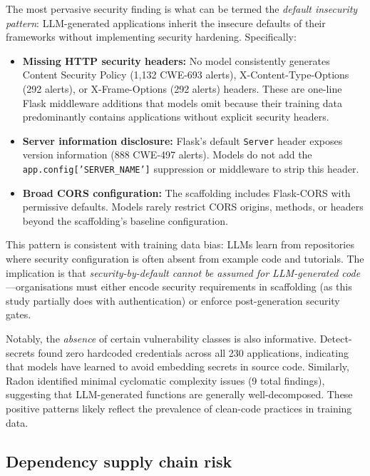 The most pervasive security finding is what can be termed the \textit{default insecurity pattern}: LLM-generated applications inherit the insecure defaults of their frameworks without implementing security hardening. Specifically:

\begin{itemize}
    \item \textbf{Missing HTTP security headers:} No model consistently generates Content Security Policy (1{,}132 CWE-693 alerts), X-Content-Type-Options (292 alerts), or X-Frame-Options (292 alerts) headers. These are one-line Flask middleware additions that models omit because their training data predominantly contains applications without explicit security headers.
    \item \textbf{Server information disclosure:} Flask's default \texttt{Server} header exposes version information (888 CWE-497 alerts). Models do not add the \texttt{app.config['SERVER\_NAME']} suppression or middleware to strip this header.
    \item \textbf{Broad CORS configuration:} The scaffolding includes Flask-CORS with permissive defaults. Models rarely restrict CORS origins, methods, or headers beyond the scaffolding's baseline configuration.
\end{itemize}

This pattern is consistent with training data bias: LLMs learn from repositories where security configuration is often absent from example code and tutorials. The implication is that \textit{security-by-default cannot be assumed for LLM-generated code}---organisations must either encode security requirements in scaffolding (as this study partially does with authentication) or enforce post-generation security gates.

Notably, the \textit{absence} of certain vulnerability classes is also informative. Detect-secrets found zero hardcoded credentials across all 230 applications, indicating that models have learned to avoid embedding secrets in source code. Similarly, Radon identified minimal cyclomatic complexity issues (9 total findings), suggesting that LLM-generated functions are generally well-decomposed. These positive patterns likely reflect the prevalence of clean-code practices in training data.

\subsection{Dependency supply chain risk}

